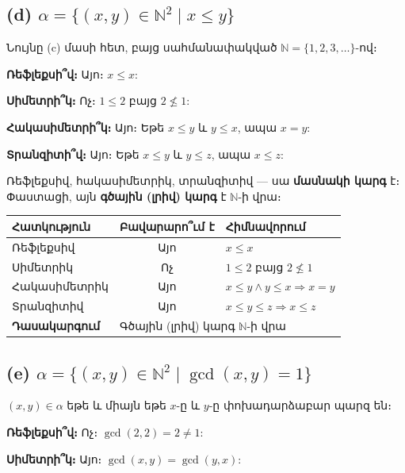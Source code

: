 \documentclass[12pt, a4paper]{article}
\newcommand{\N}{\mathbb{N}}
\begin{document}
\subsection*{(d)\; $\alpha = \{(x,y) \in \N^2 \mid x \le y\}$}

Նույնը (c) մասի հետ, բայց սահմանափակված $\N = \{1, 2, 3, \dots\}$-ով։

\textbf{Ռեֆլեքսի՞վ։} Այո։ $x \le x$: \checkmark

\textbf{Սիմետրի՞կ։} Ոչ։ $1 \le 2$ բայց $2 \nleq 1$:

\textbf{Հակասիմետրի՞կ։} Այո։ Եթե $x \le y$ և $y \le x$, ապա $x=y$: \checkmark

\textbf{Տրանզիտի՞վ։} Այո։ Եթե $x \le y$ և $y \le z$, ապա $x \le z$: \checkmark

\begin{answerbox}
Ռեֆլեքսիվ, հակասիմետրիկ, տրանզիտիվ — սա \textbf{մասնակի կարգ} է։ Փաստացի, այն \textbf{գծային (լրիվ) կարգ} է $\N$-ի վրա։
\end{answerbox}

\begin{center}
\renewcommand{\arraystretch}{1.15}
\begin{tabular}{l|c|l}
  \toprule
  \textbf{Հատկություն} & \textbf{Բավարարո՞ւմ է} & \textbf{Հիմնավորում} \\
  \midrule
  Ռեֆլեքսիվ      & Այո & $x \le x$ \\
  Սիմետրիկ      & Ոչ  & $1\le 2$ բայց $2\nleq 1$ \\
  Հակասիմետրիկ  & Այո & $x\le y\land y\le x \Rightarrow x=y$ \\
  Տրանզիտիվ     & Այո & $x\le y\le z \Rightarrow x\le z$ \\
  \midrule
  \textbf{Դասակարգում} & \multicolumn{2}{l}{Գծային (լրիվ) կարգ $\N$-ի վրա} \\
  \bottomrule
\end{tabular}
\end{center}

\subsection*{(e)\; $\alpha = \{(x,y) \in \N^2 \mid \gcd(x,y) = 1\}$}

$(x,y) \in \alpha$ եթե և միայն եթե $x$-ը և $y$-ը փոխադարձաբար պարզ են։

\textbf{Ռեֆլեքսի՞վ։} Ոչ։ $\gcd(2,2) = 2 \ne 1$:

\textbf{Սիմետրի՞կ։} Այո։ $\gcd(x,y) = \gcd(y,x)$: \checkmark
\end{document}
